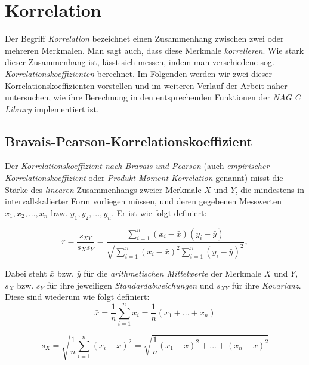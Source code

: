 \section{Korrelation}

Der Begriff {\it Korrelation} bezeichnet einen Zusammenhang zwischen zwei oder mehreren Merkmalen. Man sagt auch, dass diese Merkmale {\it korrelieren}. Wie stark dieser Zusammenhang ist, lässt sich messen, indem man verschiedene sog. {\it Korrelationskoeffizienten} berechnet. Im Folgenden werden wir zwei dieser Korrelationskoeffizienten vorstellen und im weiteren Verlauf der Arbeit näher untersuchen, wie ihre Berechnung in den entsprechenden Funktionen der {\it NAG C Library} implementiert ist.

\subsection{Bravais-Pearson-Korrelationskoeffizient}

Der {\it Korrelationskoeffizient nach Bravais und Pearson} (auch {\it empirischer Korrelationskoeffizient} oder {\it Produkt-Moment-Korrelation} genannt) misst die Stärke des {\it linearen} Zusammenhangs zweier Merkmale $X$ und $Y$, die mindestens in intervallskalierter Form vorliegen müssen, und deren gegebenen Messwerten $x_1,x_2,...,x_n$ bzw. $y_1,y_2,...,y_n$. Er ist wie folgt definiert:

\begin{equation*}
	r=\dfrac{s_{XY}}{s_Xs_Y}=\dfrac{\sum_{i=1}^{n}{(x_i-\bar{x})(y_i-\bar{y})}}{\sqrt{\sum_{i=1}^{n}{(x_i-\bar{x})^2\sum_{i=1}^{n}{(y_i-\bar{y})^2}}}},
\end{equation*}

\noindent Dabei steht $\bar{x}$ bzw. $\bar{y}$ für die {\it arithmetischen Mittelwerte} der Merkmale $X$ und $Y$, $s_{X}$ bzw. $s_{Y}$ für ihre jeweiligen {\it Standardabweichungen} und $s_{XY}$ für ihre {\it Kovarianz}. Diese sind wiederum wie folgt definiert:\\

\begin{equation*}
	\bar{x}=\dfrac{1}{n}\sum_{i=1}^{n}{x_i}=\dfrac{1}{n}(x_1+...+x_n)
\end{equation*}

\begin{equation*}
	s_X=\sqrt{\dfrac{1}{n}\sum_{i=1}^{n}{(x_i-\bar{x})^2}}=\sqrt{\dfrac{1}{n}(x_1-\bar{x})^2+...+(x_n-\bar{x})^2}
\end{equation*}

